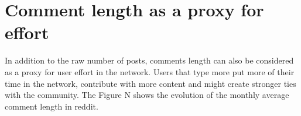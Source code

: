 



\section{Comment length as a proxy for effort}

In addition to the raw number of posts, comments length can also be considered as a proxy for user effort in the network. Users that type more put more of their time in the network, contribute with more content and might create stronger ties with the community. The Figure N shows the evolution of the monthly average comment length in reddit.

